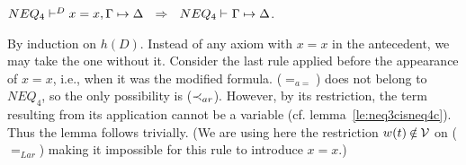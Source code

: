 %
\begin{LEMMA} \label{le:noxx}
 $\der{NEQ_4}{D}{x=x,\Gamma\Seq\Delta} \ \  \Rightarrow \ \ 
\der{NEQ_4}{}{\Gamma\Seq\Delta}$.\end{LEMMA}
\begin{PROOF} 
By induction on $h(D)$. Instead of any axiom with $x=x$ in the antecedent, we may
take the one without it. 
Consider the last rule applied before the appearance
of $x=x$, i.e., when it was the modified formula. 
($=_{a=}$) does not belong to $NEQ_4$, so the only possibility is
($\mathbin{\prec}_{ar}$). 
However, by its restriction, the term resulting from its application cannot be a variable
(cf. lemma~\ref{le:neq3cisneq4c}). Thus the lemma follows trivially.
(We are using here the restriction $w(t)\not\in\Vars$ on ($=_{Lar}$) making it impossible
for this rule to introduce $x=x$.)
% 

\end{PROOF}
